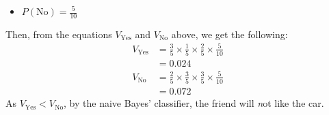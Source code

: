 \documentclass{article}
\begin{document}
\begin{enumerate}
{\begin{itemize}
                                \item $P(\text{No})=\frac{5}{10}$
                        \end{itemize}
                        Then, from the equations $V_{\text{Yes}}$ and $V_{\text{No}}$ above, we get the following:
                        \begin{align*}
                                V_{\text{Yes}}&=\frac{3}{5}\times\frac{1}{5}\times\frac{2}{5}\times\frac{5}{10}\\
                                              &=0.024\\
                                V_{\text{No}}&=\frac{2}{5}\times\frac{3}{5}\times\frac{3}{5}\times\frac{5}{10}\\
                                             &=0.072
                        \end{align*}
                        As $V_{\text{Yes}}<V_{\text{No}}$, by the naive Bayes' classifier, the friend will \emph not like the car.
                }
\end{enumerate}
\end{document}
